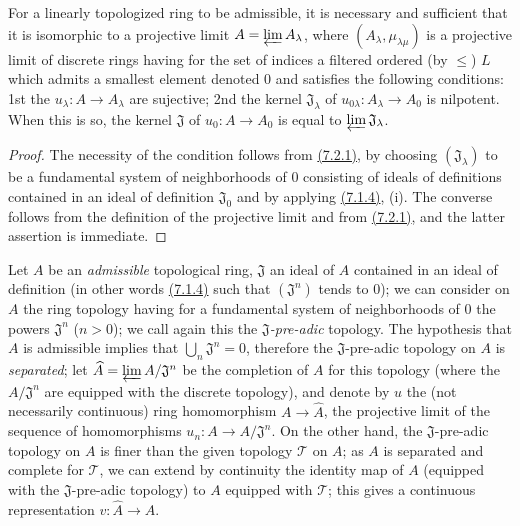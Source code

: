 \begin{lem}[7.2.2]
\label{0.7.2.2}
For a linearly topologized ring to be admissible, it is necessary and sufficient
that it is isomorphic to a projective limit $A=\varprojlim A_\lambda$, where
$(A_\lambda,\mu_{\lambda\mu})$ is a projective limit of discrete rings having
for the set of indices a filtered ordered (by $\leqslant$) $L$ which admits
a smallest element denoted $0$ and satisfies the following conditions:
1st the $u_\lambda:A\to A_\lambda$ are sujective;
2nd the kernel $\mathfrak{J}_\lambda$ of
$u_{0\lambda}:A_\lambda\to A_0$ is nilpotent. When this is so, the kernel
$\mathfrak{J}$ of $u_0:A\to A_0$ is equal to $\varprojlim\mathfrak{J}_\lambda$.
\end{lem}

\begin{proof}
\label{proof-0.7.2.2}
The necessity of the condition follows from \hyperref[0.7.2.1]{(7.2.1)}, by choosing
$(\mathfrak{J}_\lambda)$ to be a fundamental system of neighborhoods of $0$
consisting of ideals of definitions contained in an ideal of definition
$\mathfrak{J}_0$ and by applying \hyperref[0.7.1.4]{(7.1.4)}, (i). The converse follows
from the definition of the projective limit and from \hyperref[0.7.2.1]{(7.2.1)}, and the
latter assertion is immediate.
\end{proof}

\begin{env}[7.2.3]
\label{0.7.2.3}
Let $A$ be an {\em admissible} topological ring, $\mathfrak{J}$ an ideal of $A$
contained in an ideal of definition (in other words \hyperref[0.7.1.4]{(7.1.4)} such that
$(\mathfrak{J}^n)$ tends to $0$); we can consider on $A$ the ring topology
having for a fundamental system of neighborhoods of $0$ the powers
$\mathfrak{J}^n$ ($n>0$); we call again this the {\em $\mathfrak{J}$-pre-adic}
topology. The hypothesis that $A$ is admissible implies that
$\bigcup_n\mathfrak{J}^n=0$, therefore the $\mathfrak{J}$-pre-adic topology on
$A$ is {\em separated}; let $\widehat{A}=\varprojlim A/\mathfrak{J}^n$ be the
completion of $A$ for this topology (where the $A/\mathfrak{J}^n$ are equipped
with the discrete topology), and denote by $u$ the (not necessarily continuous)
ring homomorphism $A\to\widehat{A}$, the projective limit of the sequence of
homomorphisms $u_n:A\to A/\mathfrak{J}^n$. On the other hand, the
$\mathfrak{J}$-pre-adic topology on $A$ is finer than the given topology
$\mathcal{T}$ on $A$; as $A$ is separated and complete for $\mathcal{T}$, we can
extend by continuity the identity map of $A$ (equipped with the
$\mathfrak{J}$-pre-adic topology) to $A$ equipped with $\mathcal{T}$; this
gives a continuous representation $v:\widehat{A}\to A$.
\end{env}

